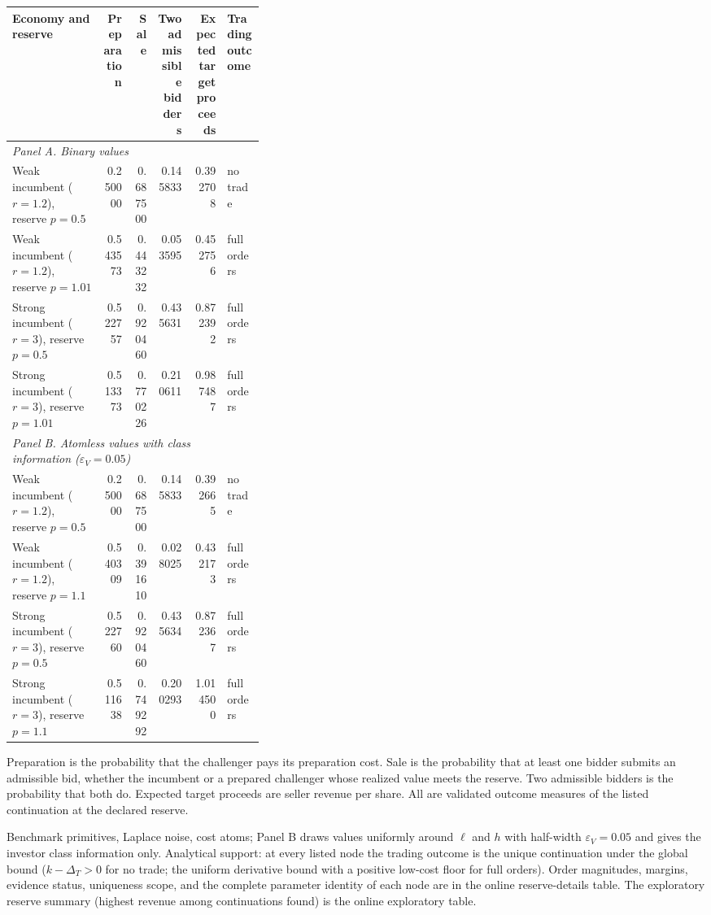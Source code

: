 \begin{threeparttable}
\setlength{\tabcolsep}{3pt}
\begin{tabular*}{\linewidth}{@{\extracolsep{\fill}}p{0.36\linewidth}rrrrl@{}}
\toprule
Economy and reserve & Preparation & Sale & \shortstack{Two admissible\\bidders} & \shortstack{Expected target\\proceeds} & Trading outcome \\
\midrule
\multicolumn{6}{l}{\emph{Panel A. Binary values}} \\
Weak incumbent ($r=1.2$), reserve $p=0.5$ & 0.250000 & 0.687500 & 0.145833 & 0.392708 & no trade \\
Weak incumbent ($r=1.2$), reserve $p=1.01$ & 0.543573 & 0.443232 & 0.053595 & 0.452756 & full orders \\
Strong incumbent ($r=3$), reserve $p=0.5$ & 0.522757 & 0.920460 & 0.435631 & 0.872392 & full orders \\
Strong incumbent ($r=3$), reserve $p=1.01$ & 0.513373 & 0.770226 & 0.210611 & 0.987487 & full orders \\
\midrule
\multicolumn{6}{l}{\emph{Panel B. Atomless values with class information ($\varepsilon_V=0.05$)}} \\
Weak incumbent ($r=1.2$), reserve $p=0.5$ & 0.250000 & 0.687500 & 0.145833 & 0.392665 & no trade \\
Weak incumbent ($r=1.2$), reserve $p=1.1$ & 0.540309 & 0.391610 & 0.028025 & 0.432173 & full orders \\
Strong incumbent ($r=3$), reserve $p=0.5$ & 0.522760 & 0.920460 & 0.435634 & 0.872367 & full orders \\
Strong incumbent ($r=3$), reserve $p=1.1$ & 0.511638 & 0.749292 & 0.200293 & 1.014500 & full orders \\
\bottomrule
\end{tabular*}
\begin{tablenotes}\footnotesize
\item Preparation is the probability that the challenger pays its preparation cost. Sale is the probability that at least one bidder submits an admissible bid, whether the incumbent or a prepared challenger whose realized value meets the reserve. Two admissible bidders is the probability that both do. Expected target proceeds are seller revenue per share. All are validated outcome measures of the listed continuation at the declared reserve.
\item Benchmark primitives, Laplace noise, cost atoms; Panel B draws values uniformly around $\ell$ and $h$ with half-width $\varepsilon_V=0.05$ and gives the investor class information only. Analytical support: at every listed node the trading outcome is the unique continuation under the global bound ($k-\Delta_T>0$ for no trade; the uniform derivative bound with a positive low-cost floor for full orders). Order magnitudes, margins, evidence status, uniqueness scope, and the complete parameter identity of each node are in the online reserve-details table. The exploratory reserve summary (highest revenue among continuations found) is the online exploratory table.
\end{tablenotes}
\end{threeparttable}
